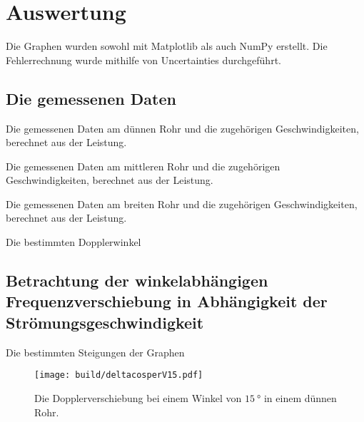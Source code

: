 \section{Auswertung}
\label{sec:Auswertung}


Die Graphen wurden sowohl mit Matplotlib \cite{matplotlib} als auch NumPy \cite{numpy} erstellt. Die
Fehlerrechnung wurde mithilfe von Uncertainties \cite{uncertainties} durchgeführt.

\subsection{Die gemessenen Daten}

\begin{table}
 \centering
 \caption{Die gemessenen Daten am dünnen Rohr und die zugehörigen Geschwindigkeiten, berechnet aus der Leistung.}
 
 \label{tab:k}
\end{table}

\begin{table}
 \centering
 \caption{Die gemessenen Daten am mittleren Rohr und die zugehörigen Geschwindigkeiten, berechnet aus der Leistung.}
 
 \label{tab:m}
\end{table}

\begin{table}
 \centering
 \caption{Die gemessenen Daten am breiten Rohr und die zugehörigen Geschwindigkeiten, berechnet aus der Leistung.}
 
 \label{tab:b}
\end{table}

\begin{table}
 \centering
 \caption{Die bestimmten Dopplerwinkel}
 
 \label{tab:dopplerwinkel}
\end{table}

\subsection{Betrachtung der winkelabhängigen Frequenzverschiebung in Abhängigkeit der Strömungsgeschwindigkeit}

\begin{table}
 \centering
 \caption{Die bestimmten Steigungen der Graphen}
 
 \label{tab:steigungen}
\end{table}

\begin{figure}
 \centering
 \caption{Die Dopplerverschiebung bei einem Winkel von $\SI{15}{\degree}$ in einem dünnen Rohr.}
 \texttt{[image: build/deltacosperV15.pdf]}
 \label{fig:k15}
\end{figure}


